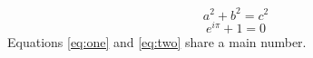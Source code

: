 \documentclass{article}
\begin{document}
\begin{equation}\label{eq:one}
a^2+b^2=c^2
\end{equation}
\begin{equation}\label{eq:two}
e^{i\pi}+1=0
\end{equation}
Equations \ref{eq:one} and \ref{eq:two} share a main number.
\end{document}
